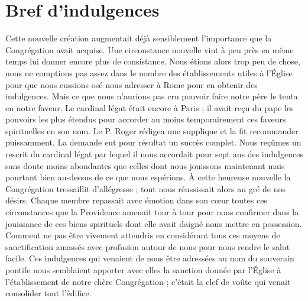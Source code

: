 \section*{Bref d'indulgences}
Cette nouvelle création augmentait déjà sensiblement l'importance que la Congrégation avait acquise. Une circonstance nouvelle vint à peu près en même temps lui donner encore plus de consistance. Nous étions alors trop peu de chose, nous ne comptions pas assez dans le nombre des établissements utiles à l'Église pour que nous eussions osé nous adresser à Rome pour en obtenir des indulgences. Mais ce que nous n'aurions pas cru pouvoir faire notre père le tenta en notre faveur. Le cardinal légat était encore à Paris ; il avait reçu du pape les pouvoirs les plus étendus pour accorder au moins temporairement ces faveurs spirituelles en son nom. Le P. Roger rédigea une supplique et la fit recommander puissamment. La demande eut pour résultat un succès complet. Nous reçûmes un rescrit du cardinal légat par lequel il nous accordait pour sept
ans des indulgences sans doute moins abondantes que celles dont nous jouissons maintenant mais pourtant bien au-dessus de ce que nous espérions. À cette heureuse nouvelle la Congrégation tressaillit d'allégresse ; tout nous réussissait alors au gré de nos désirs. Chaque membre repassait avec émotion dans son cœur toutes ces circonstances que la Providence amenait tour à tour pour nous confirmer dans la jouissance de ces biens spirituels dont elle avait daigné nous mettre en possession. Comment ne pas être vivement attendris en considérant tous ces moyens de sanctification amassés avec profusion autour de nous pour nous rendre le salut facile. Ces indulgences qui venaient de nous être adressées au nom du souverain pontife nous semblaient apporter avec elles la sanction donnée par l'Église à l'établissement de notre chère Congrégation ; c'était la clef de voûte qui venait consolider tout l'édifice.


